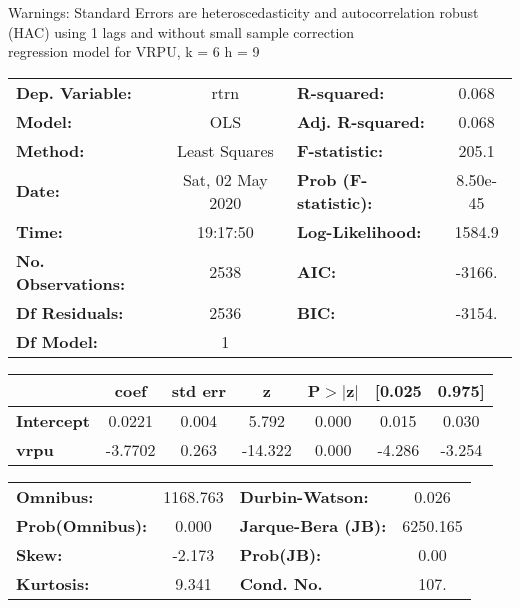 Warnings: \newline
 [1] Standard Errors are heteroscedasticity and autocorrelation robust (HAC) using 1 lags and without small sample correction\\ 

regression model for VRPU, k = 6 h = 9\begin{center}
\begin{tabular}{lclc}
\toprule
\textbf{Dep. Variable:}    &       rtrn       & \textbf{  R-squared:         } &     0.068   \\
\textbf{Model:}            &       OLS        & \textbf{  Adj. R-squared:    } &     0.068   \\
\textbf{Method:}           &  Least Squares   & \textbf{  F-statistic:       } &     205.1   \\
\textbf{Date:}             & Sat, 02 May 2020 & \textbf{  Prob (F-statistic):} &  8.50e-45   \\
\textbf{Time:}             &     19:17:50     & \textbf{  Log-Likelihood:    } &    1584.9   \\
\textbf{No. Observations:} &        2538      & \textbf{  AIC:               } &    -3166.   \\
\textbf{Df Residuals:}     &        2536      & \textbf{  BIC:               } &    -3154.   \\
\textbf{Df Model:}         &           1      & \textbf{                     } &             \\
\bottomrule
\end{tabular}
\begin{tabular}{lcccccc}
                   & \textbf{coef} & \textbf{std err} & \textbf{z} & \textbf{P$> |$z$|$} & \textbf{[0.025} & \textbf{0.975]}  \\
\midrule
\textbf{Intercept} &       0.0221  &        0.004     &     5.792  &         0.000        &        0.015    &        0.030     \\
\textbf{vrpu}      &      -3.7702  &        0.263     &   -14.322  &         0.000        &       -4.286    &       -3.254     \\
\bottomrule
\end{tabular}
\begin{tabular}{lclc}
\textbf{Omnibus:}       & 1168.763 & \textbf{  Durbin-Watson:     } &    0.026  \\
\textbf{Prob(Omnibus):} &   0.000  & \textbf{  Jarque-Bera (JB):  } & 6250.165  \\
\textbf{Skew:}          &  -2.173  & \textbf{  Prob(JB):          } &     0.00  \\
\textbf{Kurtosis:}      &   9.341  & \textbf{  Cond. No.          } &     107.  \\
\bottomrule
\end{tabular}
\end{center}

